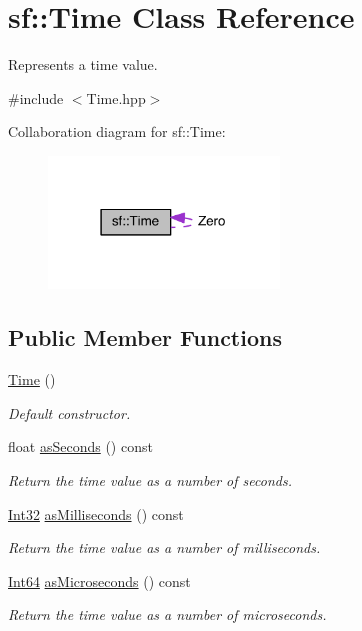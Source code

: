 \hypertarget{classsf_1_1_time}{\section{sf\-:\-:Time Class Reference}
\label{classsf_1_1_time}
}


Represents a time value.  




{\ttfamily \#include $<$Time.\-hpp$>$}



Collaboration diagram for sf\-:\-:Time\-:
\nopagebreak
\begin{figure}[H]
\begin{center}
\leavevmode
\includegraphics[width=174pt]{classsf_1_1_time__coll__graph}
\end{center}
\end{figure}
\subsection*{Public Member Functions}
\begin{DoxyCompactItemize}
\item 
\hyperlink{classsf_1_1_time_acba0cfbc49e3a09a22a8e079eb67a05c}{Time} ()
\begin{DoxyCompactList}\small\item\em Default constructor. \end{DoxyCompactList}\item 
float \hyperlink{classsf_1_1_time_a7538140d095e48da9d7eee015dd455a9}{as\-Seconds} () const 
\begin{DoxyCompactList}\small\item\em Return the time value as a number of seconds. \end{DoxyCompactList}\item 
\hyperlink{namespacesf_ac2dfd4952377a26dee4750e2e4a30a15}{Int32} \hyperlink{classsf_1_1_time_a85e6deb41fa71896508ce0f64059a6ae}{as\-Milliseconds} () const 
\begin{DoxyCompactList}\small\item\em Return the time value as a number of milliseconds. \end{DoxyCompactList}\item 
\hyperlink{namespacesf_a2840579fed3494d9f330baf7a5a19903}{Int64} \hyperlink{classsf_1_1_time_ae41a7e0ca73ceea771b3c150c12abdd2}{as\-Microseconds} () const 
\begin{DoxyCompactList}\small\item\em Return the time value as a number of microseconds. \end{DoxyCompactList}\end{DoxyCompactItemize}
